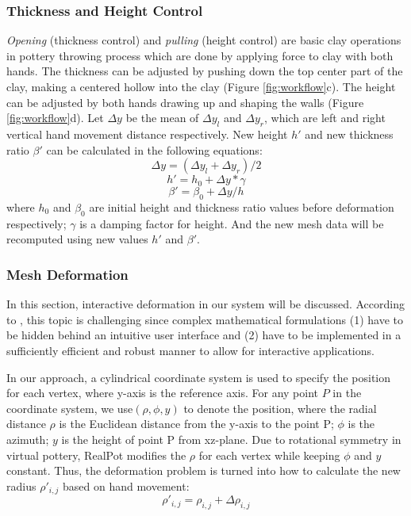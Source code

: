 \documentclass{svjour3}                     %
\begin{document}
\subsubsection{Thickness and Height Control}
\label{sec:4.2.2}
\textit{Opening} (thickness control) and \textit{pulling} (height control) are basic clay operations in pottery throwing process which are done by applying force to clay with both hands. The thickness can be adjusted by pushing down the top center part of the clay, making a centered hollow into the clay (Figure \ref{fig:workflow}c). The height can be adjusted by both hands drawing up and shaping the walls (Figure \ref{fig:workflow}d).
Let $\Delta y$ be the mean of $\Delta y_{l}$ and $\Delta y_{r}$, which are left and right vertical hand movement distance respectively. New height $h'$ and new thickness ratio $\beta'$ can be calculated in the following equations:
\begin{equation}
\Delta y = (\Delta y_{l} + \Delta y_{r})/2
\end{equation}
\begin{equation}
h' = h_{0} + \Delta y * \gamma
\end{equation}
\begin{equation}
\beta' = \beta_{0} + \Delta y/ h
\end{equation}
where $h_{0}$ and $\beta_{0}$ are initial height and thickness ratio values before deformation respectively; $\gamma$ is a damping factor for height. And the new mesh data will be recomputed using new values $h'$ and $\beta'$.

\subsubsection{Mesh Deformation}
\label{sec:4.2.3}
In this section, interactive deformation in our system will be discussed. According to \cite{botsch2010polygon}, this topic is challenging since complex mathematical formulations (1) have to be hidden behind an intuitive user interface and (2) have to be implemented in a sufficiently efficient and robust manner to allow for interactive applications.

In our approach, a cylindrical coordinate system is used to specify the position for each vertex, where y-axis is the reference axis. For any point $P$ in the coordinate system, we use$(\rho, \phi, y)$ to denote the position, where the radial distance $\rho$ is the Euclidean distance from the y-axis to the point P; $\phi$ is the azimuth; $y$ is the height of point P from xz-plane.
Due to rotational symmetry in virtual pottery, RealPot modifies the $\rho$ for each vertex while keeping $\phi$ and $y$ constant. Thus, the deformation problem is turned into how to calculate the new radius $\rho'_{i,j}$ based on hand movement:
\begin{equation}
\rho'_{i,j} = \rho_{i,j} + \Delta \rho_{i,j}
\end{equation}
\end{document}
